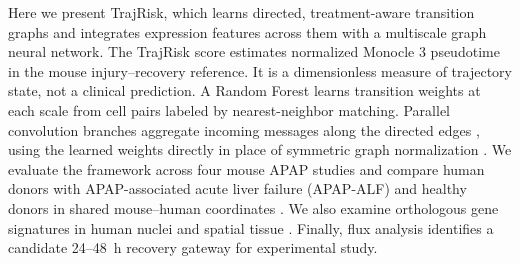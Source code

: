 Here we present TrajRisk, which learns directed, treatment-aware transition graphs and integrates expression features across them with a multiscale graph neural network. The TrajRisk score estimates normalized Monocle 3 pseudotime in the mouse injury--recovery reference. It is a dimensionless measure of trajectory state, not a clinical prediction. A Random Forest \cite{ref042} learns transition weights at each scale from cell pairs labeled by nearest-neighbor matching. Parallel convolution branches aggregate incoming messages along the directed edges \cite{ref043}, using the learned weights directly in place of symmetric graph normalization \cite{ref044}. We evaluate the framework across four mouse APAP studies and compare human donors with APAP-associated acute liver failure (APAP-ALF) and healthy donors in shared mouse--human coordinates \cite{ref019}. We also examine orthologous gene signatures in human nuclei and spatial tissue \cite{ref045,ref046}. Finally, flux analysis identifies a candidate 24--48~h recovery gateway for experimental study.
